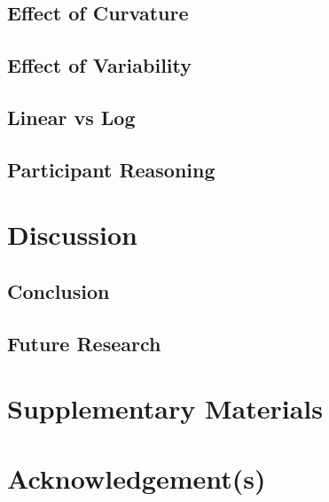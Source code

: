 \documentclass[]{interact}
\theoremstyle{plain}%
\theoremstyle{definition}
\theoremstyle{remark}
\begin{document}
\hypertarget{effect-of-curvature}{%
\subsection{Effect of Curvature}\label{effect-of-curvature}}

\hypertarget{effect-of-variability}{%
\subsection{Effect of Variability}\label{effect-of-variability}}

\hypertarget{linear-vs-log}{%
\subsection{Linear vs Log}\label{linear-vs-log}}

\hypertarget{participant-reasoning}{%
\subsection{Participant Reasoning}\label{participant-reasoning}}

\hypertarget{discussion}{%
\section{Discussion}\label{discussion}}

\hypertarget{conclusion}{%
\subsection{Conclusion}\label{conclusion}}

\hypertarget{future-research}{%
\subsection{Future Research}\label{future-research}}

\hypertarget{supplementary-materials}{%
\section*{Supplementary Materials}\label{supplementary-materials}}

\hypertarget{acknowledgements}{%
\section*{Acknowledgement(s)}\label{acknowledgements}}



\end{document}
